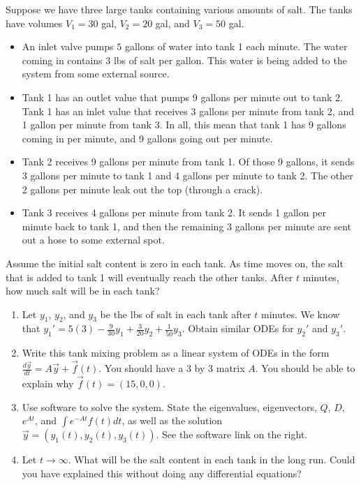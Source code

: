 \begin{problem} 
Suppose we have three large tanks containing various amounts of salt. 
The tanks have volumes $V_1=30$ gal, $V_2=20$ gal, and $V_3=50$ gal.  
\begin{itemize}
 \item An inlet valve pumps $5$ gallons of water into tank 1 each minute. The water coming in contains 3 lbs of salt per gallon. This water is being added to the system from some external source.   
 \item Tank 1 has an outlet value that pumps 9 gallons per minute out to tank 2. Tank 1 has an inlet value that receives 3 gallons per minute from tank 2, and 1 gallon per minute from tank 3. In all, this mean that tank 1 has 9 gallons coming in per minute, and 9 gallons going out per minute.
 \item Tank 2 receives 9 gallons per minute from tank 1.  Of those 9 gallons, it sends 3 gallons per minute to tank 1 and 4 gallons per minute to tank 2.  The other 2 gallons per minute leak out the top (through a crack).
 \item Tank 3 receives 4 gallons per minute from tank 2.  It sends 1 gallon per minute back to tank 1, and then the remaining 3 gallons per minute are sent out a hose to some external spot.  
\end{itemize}
Assume the initial salt content is zero in each tank.  As time moves on, the salt that is added to tank 1 will eventually reach the other tanks.  After $t$ minutes, how much salt will be in each tank? %
\begin{enumerate}
 \item Let $y_1$, $y_2$, and $y_3$ be the lbs of salt in each tank after $t$ minutes. We know that $y_1' = 5(3)-\frac{9}{30}y_1+\frac{3}{20}y_2+\frac{1}{50}y_3$. Obtain similar ODEs for $y_2'$ and $y_3'$.  
\item Write this tank mixing problem as a linear system of ODEs in the form $\frac{d\vec y}{dt}= A\vec y + \vec f(t)$.  You should have a 3 by 3 matrix $A$. You should be able to explain why $\vec f(t) = (15,0,0)$. 
 \item 
{}
%
Use software to solve the system. State the eigenvalues, eigenvectors, $Q$, $D$, $e^{At}$, and $\int e^{-At} f(t) dt$, as well as the solution $\vec y = (y_1(t), y_2(t),y_3(t)).$ See the software link  on the right. 
 \item Let $t\to \infty$. What will be the salt content in each tank in the long run. Could you have explained this without doing any differential equations?
\end{enumerate}
\end{problem}







